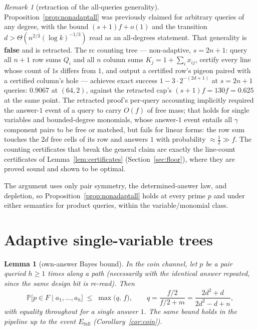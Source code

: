 \documentclass[11pt]{article}
\newtheorem{lemma}[theorem]{Lemma}
\theoremstyle{definition}
\theoremstyle{remark}
\newtheorem{remark}[theorem]{Remark}
\newcommand{\Prob}{\mathbb{P}}
\begin{document}
\begin{remark}[retraction of the all-queries generality]
\label{rem:retraction}
Proposition~\ref{prop:nonadaptall} was previously claimed for
arbitrary queries of any degree, with the bound $(s+1)f+o(1)$ and the
transition $d>\Theta(n^{2/3}(\log k)^{-1/3})$ read as an all-degrees
statement.  That generality is \textbf{false} and is retracted.  The
rc counting tree --- non-adaptive, $s=2n+1$: query all $n+1$ row sums
$Q_i$ and all $n$ column sums $K_j=1+\sum_ix_{ij}$, certify every line
whose count of $1$s differs from $1$, and output a certified row's
pigeon paired with a certified column's hole --- achieves exact success
$1-3\cdot 2^{-(2d+1)}$ at $s=2n+1$ queries: $0.9067$ at $(64,2)$,
against the retracted cap's $(s+1)f=130f=0.625$ at the same point.
The retracted proof's per-query accounting implicitly required the
answer-$1$ event of a query to carry $O(f)$ of free mass; that holds
for single variables and bounded-degree monomials, whose answer-$1$
event entails all $\gamma$ component pairs to be free or matched, but
fails for linear forms: the row sum touches the $2d$ free cells of its
row and answers $1$ with probability $\approx\frac12\gg f$.  The
counting certificates that break the general claim are exactly the
line-count certificates of Lemma~\ref{lem:certificates}
(Section~\ref{sec:floor}), where they are proved sound and shown to be
optimal.
\end{remark}

The argument uses only pair symmetry, the determined-answer law, and
depletion, so Proposition~\ref{prop:nonadaptall} holds at every prime
$p$ and under either semantics for product queries, within the
variable/monomial class.

\section{Adaptive single-variable trees}\label{sec:adaptive}

\begin{lemma}[own-answer Bayes bound]\label{lem:bayes}
In the coin channel, let $p$ be a pair queried $h\ge1$ times along a
path (necessarily with the identical answer repeated, since the same
design bit is re-read).  Then
\[
\Prob\bigl[p\in F\mid a_1,\dots,a_h\bigr]\;\le\;\max\bigl(q,\,f\bigr),
\qquad
q=\frac{f/2}{f/2+m}=\frac{2d^2+d}{2d^2-d+n},
\]
with equality throughout for a single answer $1$.  The same bound holds
in the pipeline up to the event $E_{\mathrm{full}}$
(Corollary~\ref{cor:coin}).
\end{lemma}
\end{document}
